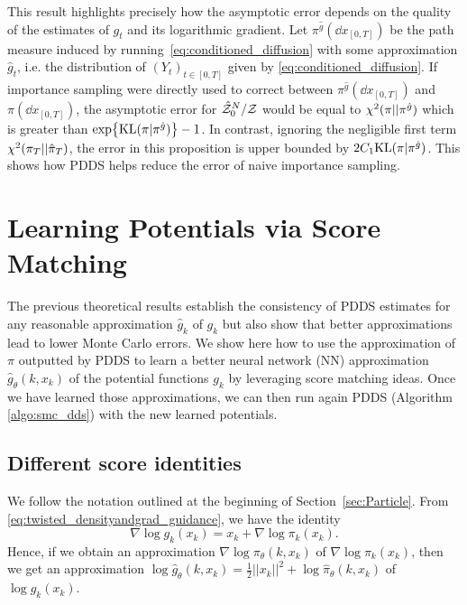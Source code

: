 \documentclass{article}
\theoremstyle{plain}
\theoremstyle{definition}
\theoremstyle{remark}
\begin{document}
\newcommand{\pihatg}{\pi^{\hat g}}
This result highlights precisely how the asymptotic error depends on the quality of the estimates of $g_t$ and its logarithmic gradient. Let $\pihatg(\dd x_{[0,T]})$ be the path measure induced by running~\eqref{eq:conditioned_diffusion} with some approximation $\hat g_t$, i.e. the distribution of $(Y_t)_{t \in [0,T]}$ given by \eqref{eq:conditioned_diffusion}. If importance sampling were directly used to correct between $\pihatg(\dd x_{[0,T]})$ and $\pi(\dd x_{[0,T]})$, the asymptotic error for $\hat {\mathcal Z}^N_0/\mathcal Z$ would be equal to $\chisquared{\pi}{\pihatg}$ which is greater than $\exp{\KLLigne{\pi}{\pihatg}} - 1$. In contrast, ignoring the negligible first term $\chi^2(\pi_T||\hat \pi_T)$, the error in this proposition is upper bounded by $2C_1 \KLLigne{\pi}{\pihatg}$. This shows how PDDS helps reduce the error of naive importance sampling.

\section{Learning Potentials via Score Matching}\label{sec:IterativeParticle}



The previous theoretical results establish the consistency of PDDS estimates for any reasonable approximation $\hat g_k$ of $g_k$ but also show that better approximations lead to lower Monte Carlo errors. We show here how to use the approximation of $\pi$ outputted by PDDS to learn a better neural network (NN) approximation $\hat g_\theta(k, x_k)$ of the potential functions $g_k$ by leveraging score matching ideas. Once we have learned those approximations, we can then run again PDDS (Algorithm \ref{algo:smc_dds}) with the new learned potentials. %

\subsection{Different score identities}
\label{sec:losses}
We follow the notation outlined at the beginning of Section~\ref{sec:Particle}.
From \eqref{eq:twisted_densityandgrad_guidance}, we have the identity
\begin{equation}\label{sec:potentialscore}
	\nabla \log g_k(x_k)=x_k+\nabla \log \pi_k(x_k).
\end{equation}
Hence, if we obtain an approximation $\nabla \log \pi_\theta(k,x_k)$ of $\nabla \log \pi_k(x_k)$, then we get an approximation $\log \hat g_\theta(k,x_k)= \tfrac{1}{2}||x_k||^2 +\log \hat{\pi}_\theta(k,x_k)$ of $\log g_k(x_k)$.
\end{document}
